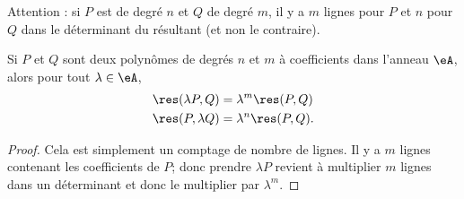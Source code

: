 Attention : si \( P\) est de degré \( n\) et \( Q\) de degré \( m\), il y a \( m\) lignes pour \( P\) et \( n\) pour \( Q\) dans le déterminant du résultant (et non le contraire).

\begin{lemma}       \label{LemBFrhgnA}
    Si \( P\) et \( Q\) sont deux polynômes de degrés \( n\) et \( m\) à coefficients dans l'anneau \( \eA\), alors pour tout \( \lambda\in \eA\),
    \begin{subequations}
        \begin{align}
            \res(\lambda P,Q)&=\lambda^m\res(P,Q)\\
            \res(P,\lambda Q)&=\lambda^n\res(P,Q).
        \end{align}
    \end{subequations}
\end{lemma}

\begin{proof}
    Cela est simplement un comptage de nombre de lignes. Il y a \( m\) lignes contenant les coefficients de \( P\); donc prendre \( \lambda P\) revient à multiplier \( m\) lignes dans un déterminant et donc le multiplier par \( \lambda^m\).
\end{proof}

